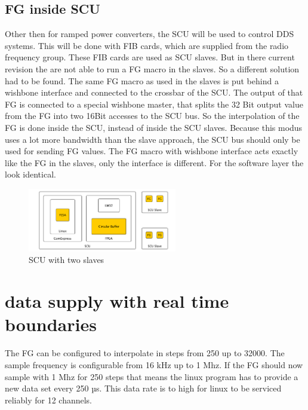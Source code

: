 \documentclass[a4paper,
              ]{jacow}
\begin{document}
\subsection{FG inside SCU}
Other then for ramped power converters, the SCU will be used to control DDS systems. This will be done with FIB cards, which are supplied from the radio frequency group. These FIB\cite{ref_fib} cards are used as SCU slaves. But in there current revision the are not able to run a FG macro in the slaves. So a different solution had to be found. The same FG macro as used in the slaves is put behind a wishbone interface and connected to the crossbar of the SCU. The output of that FG is connected to a special wishbone master, that splits the 32 Bit output value from the FG into two 16Bit accesses to the SCU bus. So the interpolation of the FG is done inside the SCU, instead of inside the SCU slaves. Because this modus uses a lot more bandwidth than the slave approach, the SCU bus should only be used for sending FG values. The FG macro with wishbone interface acts exactly like the FG in the slaves, only the interface is different. For the software layer the look
identical.

\begin{figure}[!htb]
   \centering
   \includegraphics*[width=65mm]{data_linux2fg}
   \caption{SCU with two slaves}
   \label{fig1}
\end{figure}

\section{data supply with real time boundaries}
The FG can be configured to interpolate in steps from 250 up to 32000. The sample frequency is configurable from 16 kHz up to 1 Mhz. If the FG should now sample with 1 Mhz for 250 steps
that means the linux program has to provide a new data set every 250 µs. This data rate is to high for linux to be serviced reliably for 12 channels.
\end{document}
